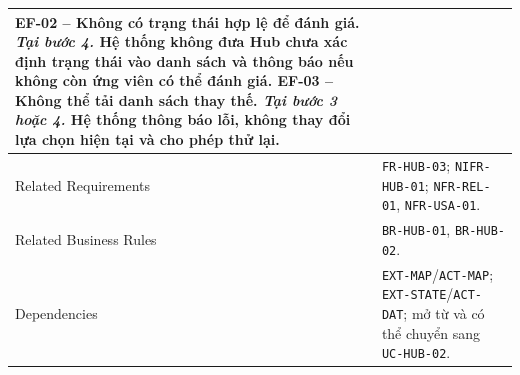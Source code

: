 \begin{longtable}{|L{42mm}|L{102mm}|}
    \textbf{EF-02 -- Không có trạng thái hợp lệ để đánh giá.} \textit{Tại bước 4.} Hệ thống không đưa Hub chưa xác định trạng thái vào danh sách và thông báo nếu không còn ứng viên có thể đánh giá.\newline
    \textbf{EF-03 -- Không thể tải danh sách thay thế.} \textit{Tại bước 3 hoặc 4.} Hệ thống thông báo lỗi, không thay đổi lựa chọn hiện tại và cho phép thử lại.\\\hline
  Related Requirements & \texttt{FR-HUB-03}; \texttt{NIFR-HUB-01}; \texttt{NFR-REL-01}, \texttt{NFR-USA-01}.\\\hline
  Related Business Rules & \texttt{BR-HUB-01}, \texttt{BR-HUB-02}.\\\hline
  Dependencies & \texttt{EXT-MAP}/\texttt{ACT-MAP}; \texttt{EXT-STATE}/\texttt{ACT-DAT}; mở từ và có thể chuyển sang \texttt{UC-HUB-02}.\\\hline
\end{longtable}
\normalsize
\clearpage

\clearpage
